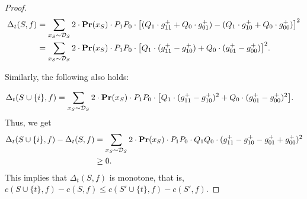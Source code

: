 \documentclass[10pt,a4paper]{amsart}
\newcommand{\fml}[1]{{\mathcal{#1}}}
\newcommand{\mbf}[1]{\ensuremath\mathbf{#1}}
\newcommand{\x}{\textbf{x}}
\newcommand{\z}{\textbf{z}}
\begin{document}
\begin{proof}
\begin{equation}
\begin{aligned}
\Delta_{t}(S,f)
%
&= \sum_{\x_{S}\sim \fml{D}_{S}} 2 \cdot \mbf{Pr}(\x_{S}) \cdot 
P_{1} P_{0} \cdot \bigl[(Q_{1} \cdot g_{11}^{+} + Q_{0} \cdot g_{01}^{+}) - (Q_{1} \cdot g_{10}^{+} + Q_{0} \cdot g_{00}^{+})\bigr]^2 \\
&= \sum_{\x_{S}\sim \fml{D}_{S}} 2 \cdot \mbf{Pr}(\x_{S}) \cdot 
P_{1} P_{0} \cdot \bigl[Q_{1} \cdot (g_{11}^{+} - g_{10}^{+}) + Q_{0} \cdot (g_{01}^{+} - g_{00}^{+})\bigr]^2.
\end{aligned}
\end{equation}

Similarly, the following also holds:

\begin{equation}
\begin{aligned}
\Delta_{t}(S\cup\{i\},f)
&= \sum_{\x_{S}\sim \fml{D}_{S}}
2 \cdot \mbf{Pr}(\x_{S}) \cdot P_{1} P_{0} \cdot \bigl[Q_{1} \cdot (g_{11}^{+} - g_{10}^{+})^2 + Q_{0} \cdot (g_{01}^{+} - g_{00}^{+})^2\bigr].
\end{aligned}
\end{equation}
%
Thus, we get
\begin{equation}
\begin{aligned}
\Delta_{t}(S\cup\{i\},f) - \Delta_{t}(S,f)
&= \sum_{\x_{S}\sim \fml{D}_{S}}
2 \cdot \mbf{Pr}(\x_{S}) \cdot P_{1} P_{0} \cdot Q_{1} Q_{0} \cdot (g_{11}^{+} - g_{10}^{+} - g_{01}^{+} + g_{00}^{+})^2 \\
&\ge 0.
\end{aligned}
\end{equation}
%
This implies that $\Delta_{t}(S,f)$ is monotone, that is, $c(S\cup\{t\},f) - c(S,f) \le c(S'\cup\{t\},f) - c(S',f)$.
\end{proof}
\end{document}
